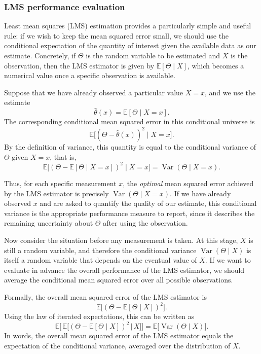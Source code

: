 \subsubsection{LMS performance evaluation}

Least mean squares (LMS) estimation provides a particularly simple and useful rule: if we wish to keep the mean squared error small, we should use the conditional expectation of the quantity of interest given the available data as our estimate.  
Concretely, if \(\Theta\) is the random variable to be estimated and \(X\) is the observation, then the LMS estimator is given by \(\mathbb{E}[\Theta \mid X]\), which becomes a numerical value once a specific observation is available.

Suppose that we have already observed a particular value \(X = x\), and we use the estimate
\[
\hat{\theta}(x)
=
\mathbb{E}[\Theta \mid X = x].
\]
The corresponding conditional mean squared error in this conditional universe is
\[
\mathbb{E}\big[(\Theta - \hat{\theta}(x))^{2} \mid X = x\big].
\]
By the definition of variance, this quantity is equal to the conditional variance of \(\Theta\) given \(X = x\), that is,
\[
\mathbb{E}\big[(\Theta - \mathbb{E}[\Theta \mid X = x])^{2} \mid X = x\big]
=
\operatorname{Var}(\Theta \mid X = x).
\]

Thus, for each specific measurement \(x\), the \textit{optimal} mean squared error achieved by the LMS estimator is precisely \(\operatorname{Var}(\Theta \mid X = x)\).  
If we have already observed \(x\) and are asked to quantify the quality of our estimate, this conditional variance is the appropriate performance measure to report, since it describes the remaining uncertainty about \(\Theta\) after using the observation.

Now consider the situation before any measurement is taken.  
At this stage, \(X\) is still a random variable, and therefore the conditional variance \(\operatorname{Var}(\Theta \mid X)\) is itself a random variable that depends on the eventual value of \(X\).  
If we want to evaluate in advance the overall performance of the LMS estimator, we should average the conditional mean squared error over all possible observations.

Formally, the overall mean squared error of the LMS estimator is
\[
\mathbb{E}\big[(\Theta - \mathbb{E}[\Theta \mid X])^{2}\big].
\]
Using the law of iterated expectations, this can be written as
\[
\mathbb{E}\Big[\,
\mathbb{E}\big[(\Theta - \mathbb{E}[\Theta \mid X])^{2} \,\big|\, X\big]
\Big]
=
\mathbb{E}\big[\operatorname{Var}(\Theta \mid X)\big].
\]
In words, the overall mean squared error of the LMS estimator equals the expectation of the conditional variance, averaged over the distribution of \(X\).

